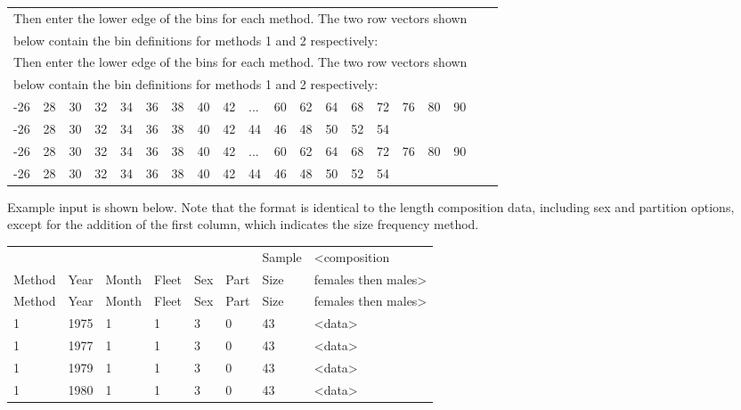 \begin{center}
	\begin{tabular}{p{0.4cm} p{0.4cm} p{0.4cm} p{0.4cm} p{0.4cm} p{0.4cm} p{0.5cm} p{0.5cm} p{0.5cm} p{0.5cm} p{0.5cm} p{0.5cm} p{0.5cm} p{0.5cm} p{0.5cm} p{0.5cm} p{0.5cm} p{0.5cm} p{0.5cm} p{0.25cm}}
		\multicolumn{18}{l}{Then enter the lower edge of the bins for each method. The two row vectors shown} \\
		\multicolumn{18}{l}{below contain the bin definitions for methods 1 and 2 respectively:} \\
		\multicolumn{18}{l}{Then enter the lower edge of the bins for each method. The two row vectors shown} \\
		\multicolumn{18}{l}{below contain the bin definitions for methods 1 and 2 respectively:} \\
		\hline
		-26 & 28 & 30 & 32 & 34 & 36 & 38 & 40 & 42 & ... & 60 & 62 & 64 & 68 & 72 & 76 & 80 & 90 \Tstrut\\
		-26 & 28 & 30 & 32 & 34 & 36 & 38 & 40 & 42 &  44 & 46 & 48 & 50 & 52 & \multicolumn{4}{l}{54} \Bstrut\\
		-26 & 28 & 30 & 32 & 34 & 36 & 38 & 40 & 42 & ... & 60 & 62 & 64 & 68 & 72 & 76 & 80 & 90 \Tstrut\\
		-26 & 28 & 30 & 32 & 34 & 36 & 38 & 40 & 42 &  44 & 46 & 48 & 50 & 52 & \multicolumn{4}{l}{54} \Bstrut\\
		\hline 
	\end{tabular}
\end{center}

Example input is shown below. Note that the format is identical to the length composition data, including sex and partition options, except for the addition of the first column, which indicates the size frequency method.

\begin{center}
	\begin{tabular}{p{1.5cm} p{1cm} p{1cm} p{1cm} p{1cm} p{1cm} p{1.5cm} p{5cm}}
		\hline
		& & & & & & Sample & <composition \Tstrut\\
		Method & Year & Month & Fleet & Sex & Part & Size & females then males> \Bstrut\\
		Method & Year & Month & Fleet & Sex & Part & Size & females then males> \Bstrut\\
		\hline
		1 & 1975 & 1 & 1 & 3 & 0 & 43 & <data> \Tstrut\\
		1 & 1977 & 1 & 1 & 3 & 0 & 43 & <data> \\
		1 & 1979 & 1 & 1 & 3 & 0 & 43 & <data> \\
		1 & 1980 & 1 & 1 & 3 & 0 & 43 & <data> \Bstrut\\
		\hline
	\end{tabular}
\end{center}

